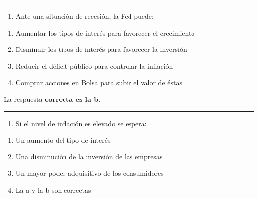 \documentclass[
  letterpaper,
  DIV=11,
  numbers=noendperiod]{scrreprt}
\providecommand{\tightlist}{%
  \setlength{\itemsep}{0pt}\setlength{\parskip}{0pt}}\usepackage{longtable,booktabs,array}
\begin{document}
\begin{center}\rule{0.5\linewidth}{0.5pt}\end{center}

\begin{enumerate}
\def\labelenumi{\arabic{enumi}.}
\setcounter{enumi}{58}
\tightlist
\item
  Ante una situación de recesión, la Fed puede:
\end{enumerate}

\begin{enumerate}
\def\labelenumi{\alph{enumi}.}
\item
  Aumentar los tipos de interés para favorecer el crecimiento
\item
  Disminuir los tipos de interés para favorecer la inversión
\item
  Reducir el déficit público para controlar la inflación
\item
  Comprar acciones en Bolsa para subir el valor de éstas
\end{enumerate}

\begin{tcolorbox}[enhanced jigsaw, left=2mm, opacityback=0, colback=white, breakable, arc=.35mm, bottomrule=.15mm, rightrule=.15mm, toprule=.15mm, leftrule=.75mm, colframe=quarto-callout-tip-color-frame]
\begin{minipage}[t]{5.5mm}
\textcolor{quarto-callout-tip-color}{\faLightbulb}
\end{minipage}%
\begin{minipage}[t]{\textwidth - 5.5mm}

La respuesta \textbf{correcta es la b}.

\end{minipage}%
\end{tcolorbox}

\begin{center}\rule{0.5\linewidth}{0.5pt}\end{center}

\begin{enumerate}
\def\labelenumi{\arabic{enumi}.}
\setcounter{enumi}{59}
\tightlist
\item
  Si el nivel de inflación es elevado se espera:
\end{enumerate}

\begin{enumerate}
\def\labelenumi{\alph{enumi}.}
\item
  Un aumento del tipo de interés
\item
  Una disminución de la inversión de las empresas
\item
  Un mayor poder adquisitivo de los consumidores
\item
  La a y la b son correctas
\end{enumerate}
\end{document}
